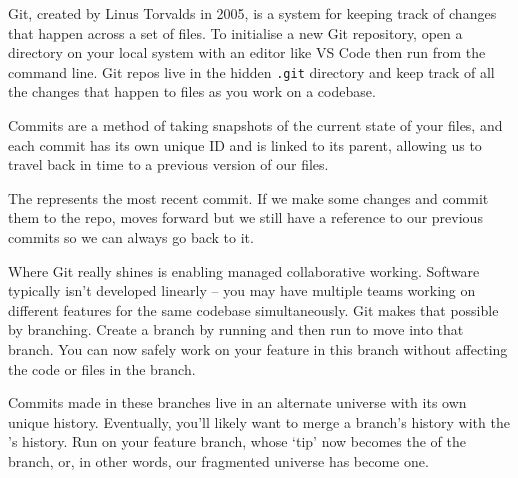 Git, created by Linus Torvalds in 2005, is a system for keeping track of changes that happen across a set of files. To initialise a new Git repository, open a directory on your local system with an editor like VS Code then run  from the command line. Git repos live in the hidden \texttt{.git} directory and keep track of all the changes that happen to files as you work on a codebase.

Commits are a method of taking snapshots of the current state of your files, and each commit has its own unique ID and is linked to its parent, allowing us to travel back in time to a previous version of our files.

The  represents the most recent commit. If we make some changes and commit them to the repo,  moves forward but we still have a reference to our previous commits so we can always go back to it.

Where Git really shines is enabling managed collaborative working. Software typically isn't developed linearly -- you may have multiple teams working on different features for the same codebase simultaneously. Git makes that possible by branching. Create a branch by running  and then run  to move into that branch. You can now safely work on your feature in this branch without affecting the code or files in the  branch.

Commits made in these branches live in an alternate universe with its own unique history. Eventually, you'll likely want to merge a branch's history with the 's history. Run  on your feature branch, whose `tip' now becomes the  of the  branch, or, in other words, our fragmented universe has become one.